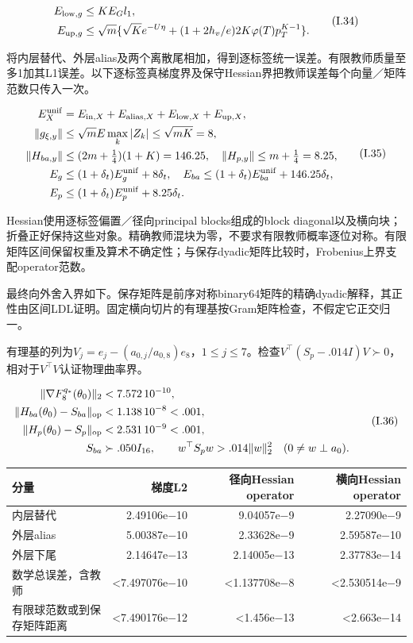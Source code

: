 \documentclass[11pt,a4paper]{article}
\begin{document}
\[
\begin{aligned}
E_{{\rm low},g}&\le KE_Gl_1,\\
E_{{\rm up},g}&\le\sqrt m\{\sqrt K e^{-U\eta}+(1+2h_v/e)2K\varphi(T)p_T^{K-1}\}.
\end{aligned}
\tag{I.34}
\]

将内层替代、外层alias及两个离散尾相加，得到逐标签统一误差。有限教师质量至多1加其L1误差。以下逐标签真梯度界及保守Hessian界把教师误差每个向量／矩阵范数只传入一次。

\[
\begin{aligned}
E_X^{\rm unif}&=E_{{\rm in},X}+E_{{\rm alias},X}+E_{{\rm low},X}+E_{{\rm up},X},\\
\|g_{\xi,y}\|&\le\sqrt m E\max_k|Z_k|\le\sqrt{mK}=8,\\
\|H_{ba,y}\|&\le(2m+\tfrac14)(1+K)=146.25,\quad\|H_{p,y}\|\le m+\tfrac14=8.25,\\
E_g&\le(1+\delta_t)E_g^{\rm unif}+8\delta_t,\quad
E_{ba}\le(1+\delta_t)E_{ba}^{\rm unif}+146.25\delta_t,\\
E_p&\le(1+\delta_t)E_p^{\rm unif}+8.25\delta_t.
\end{aligned}
\tag{I.35}
\]

Hessian使用逐标签偏置／径向principal blocks组成的block
diagonal以及横向块；折叠正好保持这些对象。精确教师混块为零，不要求有限教师概率逐位对称。有限矩阵区间保留权重及算术不确定性；与保存dyadic矩阵比较时，Frobenius上界支配operator范数。

最终向外舍入界如下。保存矩阵是前序对称binary64矩阵的精确dyadic解释，其正性由区间LDL证明。固定横向切片的有理基按Gram矩阵检查，不假定它正交归一。

有理基的列为\(V_j=e_j-(a_{0,j}/a_{0,8})e_8\)，\(1\le j\le7\)。检查\(V^\top(S_p-.014I)V\succ0\)，相对于\(V^\top V\)认证物理曲率界。

\[
\begin{aligned}
\|\nabla F_8^{q_*}(\theta_0)\|_2&<7.572\,10^{-10},\\
\|H_{ba}(\theta_0)-S_{ba}\|_{\rm op}&<1.138\,10^{-8}<.001,\\
\|H_p(\theta_0)-S_p\|_{\rm op}&<2.531\,10^{-9}<.001,\\
S_{ba}&\succ.050I_{16},\qquad
w^\top S_pw>.014\|w\|_2^2\quad(0\ne w\perp a_0).
\end{aligned}
\tag{I.36}
\]

\begin{longtable}[]{@{}lrrr@{}}
\toprule\noalign{}
分量 & 梯度L2 & 径向Hessian operator & 横向Hessian operator \\
\midrule\noalign{}
\endhead
\bottomrule\noalign{}
\endlastfoot
内层替代 & 2.49106e−10 & 9.04057e−9 & 2.27090e−9 \\
外层alias & 5.00387e−10 & 2.33628e−9 & 2.59587e−10 \\
外层下尾 & 2.14647e−13 & 2.14005e−13 & 2.37783e−14 \\
数学总误差，含教师 & \textless7.497076e−10 & \textless1.137708e−8 &
\textless2.530514e−9 \\
有限球范数或到保存矩阵距离 & \textless7.490176e−12 & \textless1.456e−13
& \textless2.663e−14 \\
\end{longtable}
\end{document}

